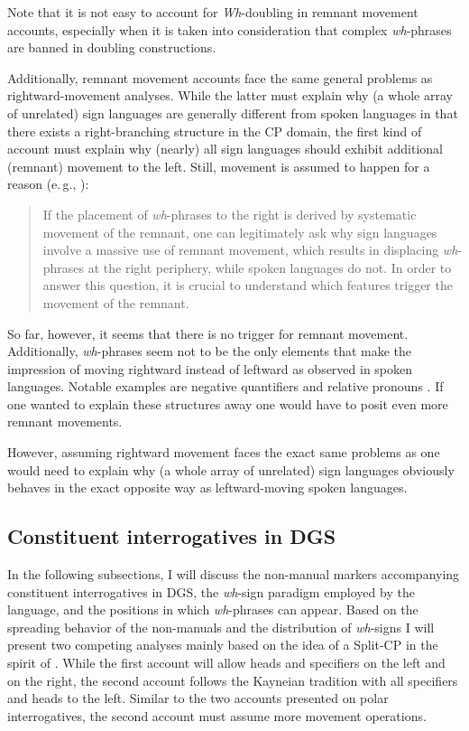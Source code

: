 Note that it is not easy to account for \textit{Wh}-doubling in remnant movement accounts, especially when it is taken into consideration that complex \textit{wh}-phrases are banned in doubling constructions.%

Additionally, remnant movement accounts face the same general problems as rightward-movement analyses. While the latter must explain why (a whole array of unrelated) sign languages are generally different from spoken languages in that there exists a right-branching structure in the CP domain, the first kind of account must explain why (nearly) all sign languages should exhibit additional (remnant) movement to the left. Still, movement is assumed to happen for a reason (e.\,g., \citealt[253]{chomsky1995categories}):

\begin{quote}
If the placement of \textit{wh}-phrases to the right is derived by systematic movement of the remnant, one can legitimately ask why sign languages involve a massive use of remnant movement, which results in displacing \textit{wh}-phrases at the right periphery, while spoken languages do not. In order to answer this question, it is crucial to understand which features trigger the movement of the remnant. \citep[291--292]{cecchetto2009another}
\end{quote}

\noindent So far, however, it seems that there is no trigger for remnant movement. Additionally, \textit{wh}-phrases seem not to be the only elements that make the impression of moving rightward instead of leftward as observed in spoken languages. Notable examples are negative quantifiers and relative pronouns \citep{cecchetto2009another}. If one wanted to explain these structures away one would have to posit even more remnant movements.

However, assuming rightward movement faces the exact same problems as one would need to explain why (a whole array of unrelated) sign languages obviously behaves in the exact opposite way as leftward-moving spoken languages.  

\subsection{Constituent interrogatives in DGS}\label{whinterrogativedgs}


In the following subsections, I will discuss the non-manual markers accompanying constituent interrogatives in DGS, the \textit{wh}-sign paradigm employed by the language, and the positions in which \textit{wh}-phrases can appear. Based on the spreading behavior of the non-manuals and the distribution of \textit{wh}-signs I will present two competing analyses mainly based on the idea of a Split-CP in the spirit of \citet{van2010complex, van2012you}. While the first account will allow heads and specifiers on the left and on the right, the second account follows the Kayneian tradition with all specifiers and heads to the left. Similar to the two accounts presented on polar interrogatives, the second account must assume more movement operations. 

